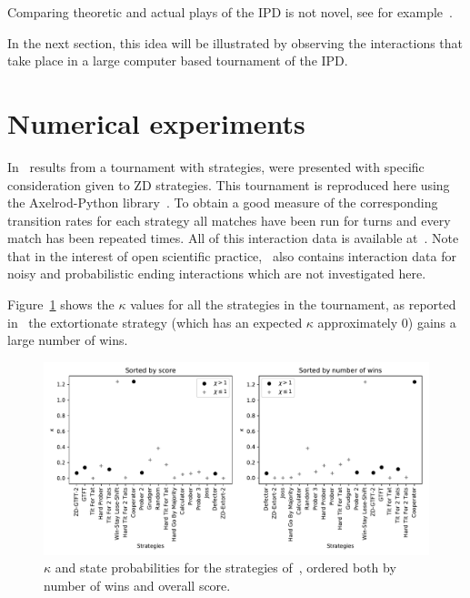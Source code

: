 \documentclass[a4paper]{article}
\begin{document}
Comparing theoretic and actual plays of the
IPD is not novel, see for example~\cite{Rand2013}.

In the next section, this idea will be illustrated by observing the interactions
that take place in a large computer based tournament of the IPD\@.

\section{Numerical experiments}\label{sec:numerical-experiments}

In~\cite{Stewart2012} results from a tournament with
 strategies,
were presented with specific consideration given to ZD strategies. This
tournament is reproduced here using the Axelrod-Python
library~\cite{Knight2016}. To obtain a good measure of the corresponding
transition rates for each strategy all matches have been run for
turns and every match has been
repeated times. All of this
interaction data is available at~\cite{vincent_knight_2018_1297075}. Note that
in the interest of open scientific practice,~\cite{vincent_knight_2018_1297075}
also contains interaction data for noisy and probabilistic ending interactions
which are not investigated here.

Figure~\ref{fig:kappa_overall_in_stewart_plotkin} shows the
\(\kappa\) values for all the strategies in the tournament, as
reported in~\cite{Stewart2012} the extortionate strategy (which has an expected
\(\kappa\) approximately 0) gains a large number of wins.

\begin{figure}[!htbp]
    \centering
    \includegraphics[width=.8\textwidth]{./assets/img/kappa_overall_in_stewart_plotkin/main.pdf}
    \caption{\(\kappa\) and state probabilities for the strategies
        of~\cite{Stewart2012}, ordered both by number of wins and overall score.
        }
    \label{fig:kappa_overall_in_stewart_plotkin}
\end{figure}
\end{document}
